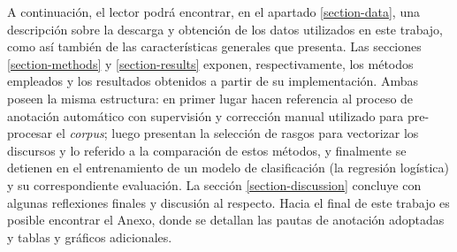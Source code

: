 A continuaci\'on, el lector podr\'a encontrar, en el apartado \ref{section-data},
una descripci\'on sobre la descarga y obtenci\'on de los datos utilizados en este
trabajo, como as\'i tambi\'en de las caracter\'isticas generales que presenta. Las
secciones \ref{section-methods} y \ref{section-results} exponen, respectivamente,
los m\'etodos empleados y los resultados obtenidos a partir de su implementaci\'on.
Ambas poseen la misma estructura: en primer lugar hacen referencia
al proceso de anotaci\'on autom\'atico con supervisi\'on y correcci\'on manual utilizado
para pre-procesar el \textit{corpus}; luego presentan la selecci\'on de rasgos
para vectorizar los discursos y lo referido a la comparaci\'on de estos m\'etodos, y
finalmente se detienen en el entrenamiento de un modelo de clasificaci\'on (la
regresi\'on log\'istica) y su correspondiente evaluaci\'on. La secci\'on
\ref{section-discussion} concluye con algunas reflexiones finales y
discusi\'on al respecto. Hacia el final de este trabajo es posible encontrar el
Anexo, donde se detallan las pautas de anotaci\'on adoptadas y tablas y gr\'aficos
adicionales.
